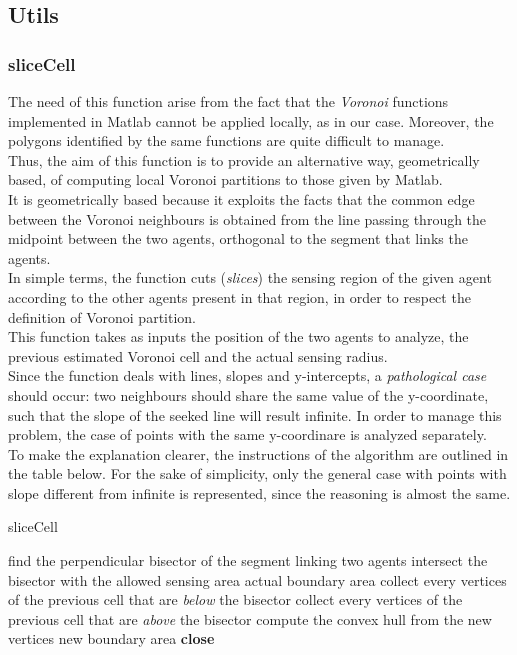 \documentclass[a4paper,11pt,oneside]{book}
\begin{document}
\subsection{Utils}
\subsubsection{sliceCell}
	The need of this function arise from the fact that the \emph{Voronoi} functions implemented in Matlab cannot be applied locally, as in our case. Moreover, the polygons identified by the same functions are quite difficult to manage.\\
	Thus, the aim of this function is to provide an alternative way, geometrically based, of computing local Voronoi partitions to those given by Matlab.\\
	It is geometrically based because it exploits the facts that the common edge between the Voronoi neighbours is obtained from the line passing through the midpoint between the two agents, orthogonal to the segment that links the agents.\\
	In simple terms, the function cuts (\emph{slices}) the sensing region of the given agent according to the other agents present in that region, in order to respect the definition of Voronoi partition.\\
	This function takes as inputs the position of the two agents to analyze, the previous estimated Voronoi cell and the actual sensing radius.\\
	Since the function deals with lines, slopes and y-intercepts, a \emph{pathological case} should occur: two neighbours should share the same value of the y-coordinate, such that the slope of the seeked line will result infinite. In order to manage this problem, the case of points with the same y-coordinare is analyzed separately.\\
	To make the explanation clearer, the instructions of the algorithm are outlined in the table below. For the sake of simplicity, only the general case with points with slope different from infinite is represented, since the reasoning is almost the same.
	\begin{algorithm}
\caption{sliceCell}\label{euclid}
\begin{algorithmic}[1]
\State find the perpendicular bisector of the segment linking two agents
\State intersect the bisector with the allowed sensing area
\State \Return actual boundary area
\Else
	\State collect every vertices of the previous cell that are \emph{below} the bisector
	\Else
	\State collect every vertices of the previous cell that are \emph{above} the bisector
	\EndIf
\EndIf
\State compute the convex hull from the new vertices
\State \Return new boundary area
\State \textbf{close}
\end{algorithmic}
\end{algorithm}	\\
\end{document}
